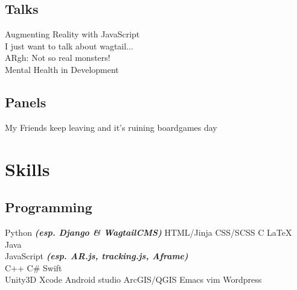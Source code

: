 \documentclass[a4paper]{deedy-resume} %
\begin{document}
\begin{minipage}[t]{0.33\textwidth}
\subsection{Talks}
Augmenting Reality with JavaScript \\
I just want to talk about wagtail... \\
ARgh: Not so real monsters! \\
Mental Health in Development \\
\subsection{Panels}
My Friends keep leaving and it's ruining boardgames day \\

\sectionspace %


\section{Skills}

\subsection{Programming}

Python {\footnotesize \textit{\textbf{(esp. Django \& WagtailCMS)}}} \textbullet{} HTML/Jinja \textbullet{} CSS/SCSS \textbullet{}
C \textbullet{} \LaTeX\ \textbullet{} Java \\
JavaScript {\footnotesize \textit{\textbf{(esp. AR.js, tracking.js, Aframe)}}} \\ \textbullet{} C++ \textbullet{} C\# \textbullet{} Swift \\
Unity3D \textbullet{} Xcode \textbullet{} Android studio \textbullet{} ArcGIS/QGIS
Emacs \textbullet{} vim \textbullet{} Wordpress \\

\sectionspace %


\end{minipage} %
\end{document}
